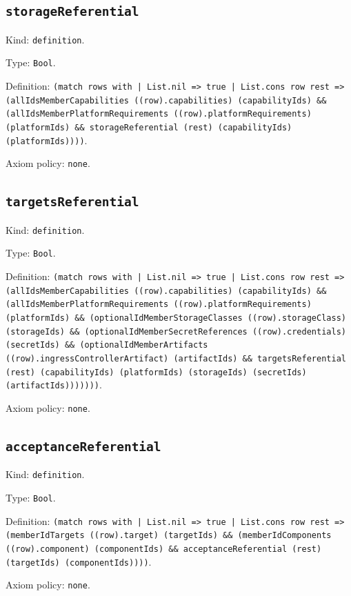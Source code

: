 \documentclass[11pt]{article}
\begin{document}
\subsection*{\texttt{storageReferential}}
\noindent Kind: \texttt{definition}.\par
\noindent Type: \texttt{Bool}.\par
\noindent Definition: \texttt{(match rows with | List.nil => true | List.cons row rest => (allIdsMemberCapabilities ((row).capabilities) (capabilityIds) \&\& (allIdsMemberPlatformRequirements ((row).platformRequirements) (platformIds) \&\& storageReferential (rest) (capabilityIds) (platformIds))))}.\par
\noindent Axiom policy: \texttt{none}.\par
\subsection*{\texttt{targetsReferential}}
\noindent Kind: \texttt{definition}.\par
\noindent Type: \texttt{Bool}.\par
\noindent Definition: \texttt{(match rows with | List.nil => true | List.cons row rest => (allIdsMemberCapabilities ((row).capabilities) (capabilityIds) \&\& (allIdsMemberPlatformRequirements ((row).platformRequirements) (platformIds) \&\& (optionalIdMemberStorageClasses ((row).storageClass) (storageIds) \&\& (optionalIdMemberSecretReferences ((row).credentials) (secretIds) \&\& (optionalIdMemberArtifacts ((row).ingressControllerArtifact) (artifactIds) \&\& targetsReferential (rest) (capabilityIds) (platformIds) (storageIds) (secretIds) (artifactIds)))))))}.\par
\noindent Axiom policy: \texttt{none}.\par
\subsection*{\texttt{acceptanceReferential}}
\noindent Kind: \texttt{definition}.\par
\noindent Type: \texttt{Bool}.\par
\noindent Definition: \texttt{(match rows with | List.nil => true | List.cons row rest => (memberIdTargets ((row).target) (targetIds) \&\& (memberIdComponents ((row).component) (componentIds) \&\& acceptanceReferential (rest) (targetIds) (componentIds))))}.\par
\noindent Axiom policy: \texttt{none}.\par
\end{document}
